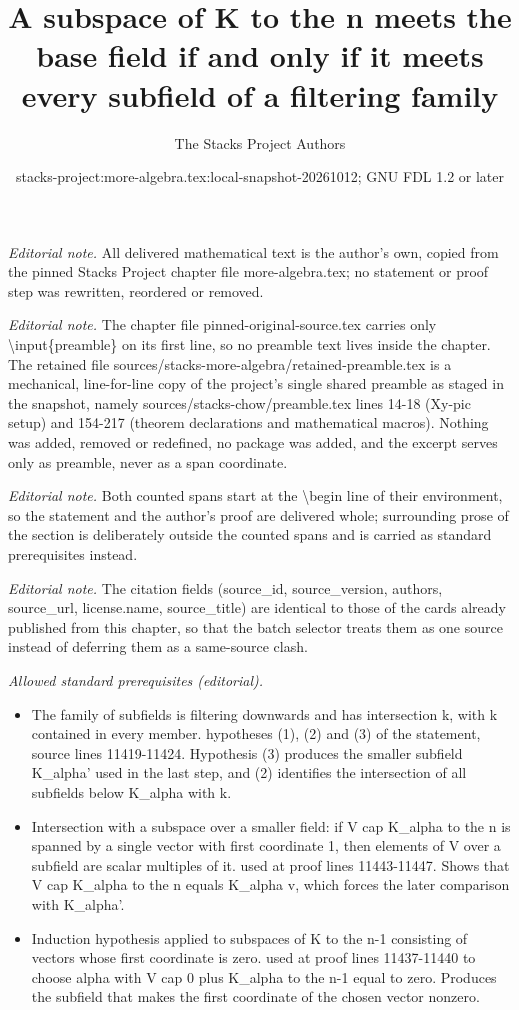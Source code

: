 \documentclass[10pt,a4paper]{amsart}
\title{A subspace of K to the n meets the base field if and only if it meets every subfield of a filtering family}
\author{The Stacks Project Authors}
\date{stacks-project:more-algebra.tex:local-snapshot-20261012; GNU FDL 1.2 or later}
\theoremstyle{plain}
\theoremstyle{definition}
\theoremstyle{remark}
\numberwithin{equation}{subsection}
\begin{document}
\maketitle
\setcounter{subsection}{1}
\noindent\textit{Editorial note.} All delivered mathematical text is the author's own, copied from the pinned Stacks Project chapter file more-algebra.tex; no statement or proof step was rewritten, reordered or removed.\par\medskip
\noindent\textit{Editorial note.} The chapter file pinned-original-source.tex carries only \textbackslash{}input\{preamble\} on its first line, so no preamble text lives inside the chapter. The retained file sources/stacks-more-algebra/retained-preamble.tex is a mechanical, line-for-line copy of the project's single shared preamble as staged in the snapshot, namely sources/stacks-chow/preamble.tex lines 14-18 (Xy-pic setup) and 154-217 (theorem declarations and mathematical macros). Nothing was added, removed or redefined, no package was added, and the excerpt serves only as preamble, never as a span coordinate.\par\medskip
\noindent\textit{Editorial note.} Both counted spans start at the \textbackslash{}begin line of their environment, so the statement and the author's proof are delivered whole; surrounding prose of the section is deliberately outside the counted spans and is carried as standard prerequisites instead.\par\medskip
\noindent\textit{Editorial note.} The citation fields (source\_id, source\_version, authors, source\_url, license.name, source\_title) are identical to those of the cards already published from this chapter, so that the batch selector treats them as one source instead of deferring them as a same-source clash.\par\medskip
\noindent\textit{Allowed standard prerequisites (editorial).}\begin{itemize}
\item The family of subfields is filtering downwards and has intersection k, with k contained in every member. hypotheses (1), (2) and (3) of the statement, source lines 11419-11424. Hypothesis (3) produces the smaller subfield K\_alpha' used in the last step, and (2) identifies the intersection of all subfields below K\_alpha with k.
\item Intersection with a subspace over a smaller field: if V cap K\_alpha to the n is spanned by a single vector with first coordinate 1, then elements of V over a subfield are scalar multiples of it. used at proof lines 11443-11447. Shows that V cap K\_alpha to the n equals K\_alpha v, which forces the later comparison with K\_alpha'.
\item Induction hypothesis applied to subspaces of K to the n-1 consisting of vectors whose first coordinate is zero. used at proof lines 11437-11440 to choose alpha with V cap 0 plus K\_alpha to the n-1 equal to zero. Produces the subfield that makes the first coordinate of the chosen vector nonzero.
\end{itemize}\medskip
\end{document}
